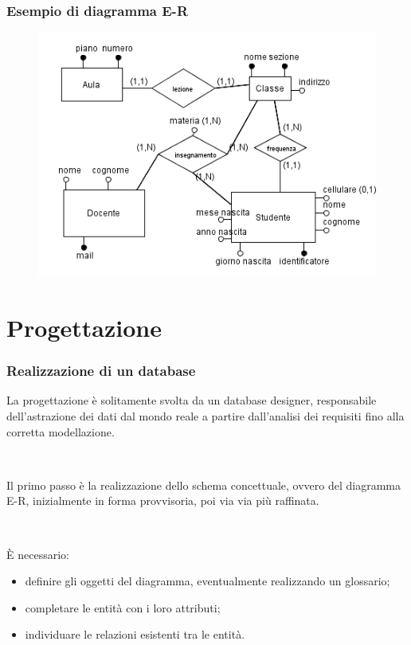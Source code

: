\documentclass[]{beamer}
\begin{document}
\begin{frame}
\frametitle{Esempio di diagramma E-R}
\begin{figure}
  \includegraphics[width=.8\columnwidth]{img/esempioer.png}
\end{figure}
\end{frame}

\section{Progettazione}

\begin{frame}
\frametitle{Realizzazione di un database}
La progettazione è solitamente svolta da un \alert<1>{database designer}, responsabile dell'astrazione dei dati dal mondo reale a partire dall'analisi dei requisiti fino alla corretta modellazione.\pause

~

Il primo passo è la realizzazione dello \alert<2>{schema concettuale}, ovvero del \alert<2>{diagramma E-R}, inizialmente in forma provvisoria, poi via via più raffinata.\pause

~

È necessario:
\begin{itemize}
  \item \alert<3>{definire gli oggetti} del diagramma, eventualmente realizzando un glossario;\pause
  \item completare le entità con i loro \alert<4>{attributi};\pause
  \item individuare le \alert<5>{relazioni} esistenti tra le entità.
\end{itemize}
\end{frame}
\end{document}

